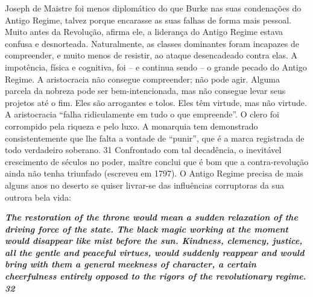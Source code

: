 Joseph de Maistre foi menos diplomático do que Burke nas suas condenações do Antigo Regime, talvez porque encarasse as suas falhas de forma mais pessoal. Muito antes da Revolução, afirma ele, a liderança do Antigo Regime estava confusa e desnorteada. Naturalmente, as classes dominantes foram incapazes de compreender, e muito menos de resistir, ao ataque desencadeado contra elas. A impotência, física e cognitiva, foi – e continua sendo – o grande pecado do Antigo Regime. A aristocracia não consegue compreender; não pode agir. Alguma parcela da nobreza pode ser bem-intencionada, mas não consegue levar seus projetos até o fim. Eles são arrogantes e tolos. Eles têm virtude, mas não virtude. A aristocracia “falha ridiculamente em tudo o que empreende”. O clero foi corrompido pela riqueza e pelo luxo. A monarquia tem demonstrado consistentemente que lhe falta a vontade de “punir”, que é a marca registrada de todo verdadeiro soberano.
 {\color{blue} 31}  
Confrontado com tal decadência, o inevitável crescimento de séculos no poder, maître conclui que é bom que a contra-revolução ainda não tenha triunfado (escreveu em 1797). O Antigo Regime precisa de mais alguns anos no deserto se quiser livrar-se das influências corruptoras da sua outrora bela vida:
 
\par
 

 \textbf{\textit{The restoration of the throne would mean a sudden relaxation of the driving force of the state. The black magic working at the moment would disappear like mist before the sun. Kindness, clemency, justice, all the gentle and peaceful virtues, would suddenly reappear and would bring with them a general meekness of character, a certain cheerfulness entirely opposed to the rigors of the revolutionary regime. {{\color{blue} 32} } } }  
 
 
\par
 
